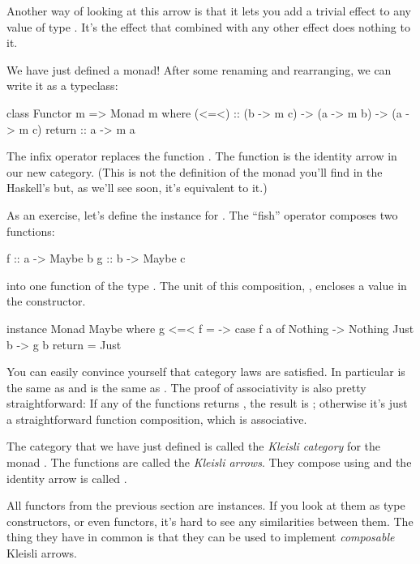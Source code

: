 \documentclass[DaoFP]{subfiles}
\begin{document}
Another way of looking at this arrow is that it lets you add a trivial effect to any value of type . It's the effect that combined with any other effect does nothing to it.

We have just defined a monad! After some renaming and rearranging, we can write it as a typeclass:
\begin{haskell}
class Functor m => Monad m where
  (<=<) :: (b -> m c) -> (a -> m b) -> (a -> m c)
  return :: a -> m a
\end{haskell}
The infix operator \hask{<=<} replaces the function . The  function is the identity arrow in our new category. (This is not the definition of the monad you'll find in the Haskell's  but, as we'll see soon, it's equivalent to it.)

As an exercise, let's define the  instance for . The ``fish'' operator \hask{<=<} composes two functions:
\begin{haskell}
f :: a -> Maybe b
g :: b -> Maybe c
\end{haskell}
into one function of the type . The unit of this composition, , encloses a value in the  constructor.
\begin{haskell}
instance Monad Maybe where
  g <=< f = \a -> case f a of
                    Nothing -> Nothing
                    Just b -> g b
  return = Just  
\end{haskell}

You can easily convince yourself that category laws are satisfied. In particular  is the same as  and  is the same as . The proof of associativity is also pretty straightforward: If any of the functions returns , the result is ; otherwise it's just a straightforward function composition, which is associative.

The category that we have just defined is called the \emph{Kleisli category} for the monad . The functions  are called the \emph{Kleisli arrows}. They compose using \hask{<=<} and the identity arrow is called .

All functors from the previous section are  instances. If you look at them as type constructors, or even functors, it's hard to see any similarities between them. The thing they have in common is that they can be used to implement \emph{composable} Kleisli arrows. 
\end{document}

